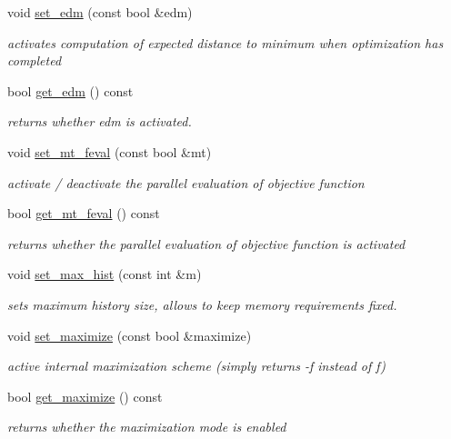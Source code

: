 \begin{DoxyCompactItemize}
void \hyperlink{classlibcmaes_1_1Parameters_ac34068e69a36d06fed6599a7247bcb2e}{set\+\_\+edm} (const bool \&edm)
\begin{DoxyCompactList}\small\item\em activates computation of expected distance to minimum when optimization has completed \end{DoxyCompactList}\item 
bool \hyperlink{classlibcmaes_1_1Parameters_a3fa757be9e734622d77a831b3576aedb}{get\+\_\+edm} () const 
\begin{DoxyCompactList}\small\item\em returns whether edm is activated. \end{DoxyCompactList}\item 
void \hyperlink{classlibcmaes_1_1Parameters_a72995fb64587e6401d8b751343750c65}{set\+\_\+mt\+\_\+feval} (const bool \&mt)
\begin{DoxyCompactList}\small\item\em activate / deactivate the parallel evaluation of objective function \end{DoxyCompactList}\item 
bool \hyperlink{classlibcmaes_1_1Parameters_aac3914b24de6312e6d1fe3d493bb42f5}{get\+\_\+mt\+\_\+feval} () const 
\begin{DoxyCompactList}\small\item\em returns whether the parallel evaluation of objective function is activated \end{DoxyCompactList}\item 
void \hyperlink{classlibcmaes_1_1Parameters_a1226eeecac97019c183a9a85185efcc8}{set\+\_\+max\+\_\+hist} (const int \&m)
\begin{DoxyCompactList}\small\item\em sets maximum history size, allows to keep memory requirements fixed. \end{DoxyCompactList}\item 
void \hyperlink{classlibcmaes_1_1Parameters_a676f84fbe8726abf5ce88e117b159867}{set\+\_\+maximize} (const bool \&maximize)
\begin{DoxyCompactList}\small\item\em active internal maximization scheme (simply returns -\/f instead of f) \end{DoxyCompactList}\item 
bool \hyperlink{classlibcmaes_1_1Parameters_afec66b0ca5465b81498189e2cc8a14dc}{get\+\_\+maximize} () const 
\begin{DoxyCompactList}\small\item\em returns whether the maximization mode is enabled \end{DoxyCompactList}\item 

\end{DoxyCompactItemize}
